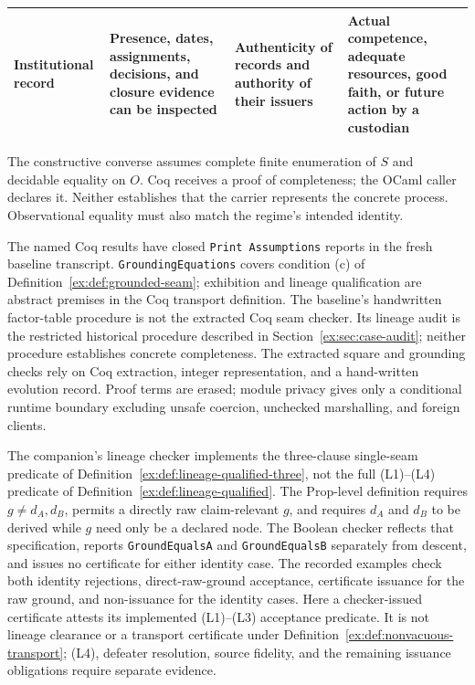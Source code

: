 \documentclass[11pt]{article}
\theoremstyle{definition}
\newcommand{\code}[1]{\texttt{#1}}
\begin{document}
\begin{table}[htbp]
\begin{tabularx}{\textwidth}{@{}p{2.1cm}LLL@{}}
Institutional record & Presence, dates, assignments, decisions, and closure evidence can be inspected & Authenticity of records and authority of their issuers & Actual competence, adequate resources, good faith, or future action by a custodian \\
\bottomrule
\end{tabularx}
\end{table}
\FloatBarrier

The constructive converse assumes complete finite enumeration of $S$ and decidable equality on $O$. Coq receives a proof of completeness; the OCaml caller declares it. Neither establishes that the carrier represents the concrete process. Observational equality must also match the regime's intended identity.

The named Coq results have closed \code{Print Assumptions} reports in the fresh baseline transcript. \code{GroundingEquations} covers condition (c) of Definition~\ref{ex:def:grounded-seam}; exhibition and lineage qualification are abstract premises in the Coq transport definition. The baseline's handwritten factor-table procedure is not the extracted Coq seam checker. Its lineage audit is the restricted historical procedure described in Section~\ref{ex:sec:case-audit}; neither procedure establishes concrete completeness. The extracted square and grounding checks rely on Coq extraction, integer representation, and a hand-written evolution record. Proof terms are erased; module privacy gives only a conditional runtime boundary excluding unsafe coercion, unchecked marshalling, and foreign clients.

The companion's lineage checker implements the three-clause single-seam predicate of Definition~\ref{ex:def:lineage-qualified-three}, not the full (L1)--(L4) predicate of Definition~\ref{ex:def:lineage-qualified}. The Prop-level definition requires $g\neq d_A,d_B$, permits a directly raw claim-relevant $g$, and requires $d_A$ and $d_B$ to be derived while $g$ need only be a declared node. The Boolean checker reflects that specification, reports \code{GroundEqualsA} and \code{GroundEqualsB} separately from descent, and issues no certificate for either identity case. The recorded examples check both identity rejections, direct-raw-ground acceptance, certificate issuance for the raw ground, and non-issuance for the identity cases. Here a checker-issued certificate attests its implemented (L1)--(L3) acceptance predicate. It is not lineage clearance or a transport certificate under Definition~\ref{ex:def:nonvacuous-transport}; (L4), defeater resolution, source fidelity, and the remaining issuance obligations require separate evidence.
\end{document}

